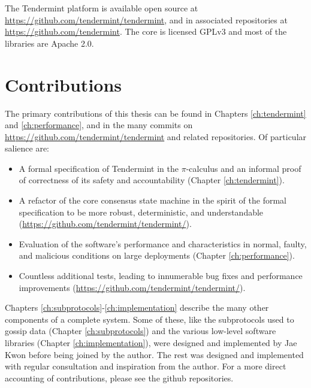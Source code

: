 The Tendermint platform is available open source at \url{https://github.com/tendermint/tendermint}, 
and in associated repositories at \url{https://github.com/tendermint}.
The core is licensed GPLv3 and most of the libraries are Apache 2.0.

\section{Contributions}

The primary contributions of this thesis can be found in Chapters \ref{ch:tendermint} and \ref{ch:performance}, 
and in the many commits on \url{https://github.com/tendermint/tendermint} and related repositories.
Of particular salience are:
\begin{itemize}  
    \item A formal specification of Tendermint in the $\pi$-calculus and 
an informal proof of correctness of its safety and accountability (Chapter \ref{ch:tendermint}).

    \item A refactor of the core consensus state machine in the spirit of the formal specification to be more robust, deterministic, and understandable (\url{https://github.com/tendermint/tendermint/}).

    \item Evaluation of the software's performance and characteristics in normal, faulty, and malicious conditions on large deployments (Chapter \ref{ch:performance}). 

    \item Countless additional tests, leading to innumerable bug fixes and performance improvements (\url{https://github.com/tendermint/tendermint/}).
\end{itemize}

Chapters \ref{ch:subprotocols}-\ref{ch:implementation} describe the many other components of a complete system.
Some of these, like the subprotocols used to gossip data (Chapter \ref{ch:subprotocols}) and the various low-level software libraries (Chapter \ref{ch:implementation}),
were designed and implemented by Jae Kwon before being joined by the author. 
The rest was designed and implemented with regular consultation and inspiration from the author.
For a more direct accounting of contributions, please see the github repositories.

